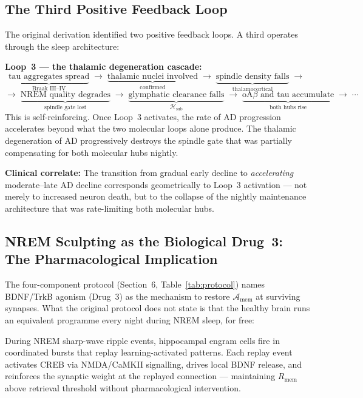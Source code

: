 \documentclass[12pt,a4paper]{article}
\newenvironment{derivenv}{%
  \begin{tcolorbox}[colback=lightgray,colframe=midgray,boxrule=0.5pt,
    arc=3pt,left=8pt,right=8pt,top=6pt,bottom=6pt,breakable]}{%
  \end{tcolorbox}}
\newcommand{\RMEM}{R_{\mathrm{mem}}}
\newcommand{\IA}{\mathcal{A}}
\begin{document}
\subsection{The Third Positive Feedback Loop}

The original derivation identified two positive
feedback loops. A third operates through the sleep
architecture:

\begin{derivenv}
\textbf{Loop~3 --- the thalamic degeneration cascade:}
\[
\underbrace{\text{tau aggregates spread}}_{\text{Braak III--IV}}
\;\longrightarrow\;
\underbrace{\text{thalamic nuclei involved}}_{\text{confirmed}}
\;\longrightarrow\;
\underbrace{\text{spindle density falls}}_{\text{thalamocortical}}
\;\longrightarrow\;
\]
\[
\longrightarrow\;
\underbrace{\text{NREM quality degrades}}_{\text{spindle gate lost}}
\;\longrightarrow\;
\underbrace{\text{glymphatic clearance falls}}_{\mathcal{H}_{\mathrm{sub}}}
\;\longrightarrow\;
\underbrace{\text{oA}\beta\text{ and tau accumulate}}_{\text{both hubs rise}}
\;\longrightarrow\;\cdots
\]
This is self-reinforcing. Once Loop~3 activates, the
rate of AD progression accelerates beyond what the
two molecular loops alone produce. The thalamic
degeneration of AD progressively destroys the spindle
gate that was partially compensating for both
molecular hubs nightly.
\end{derivenv}

\textbf{Clinical correlate:} The transition from
gradual early decline to \emph{accelerating}
moderate--late AD decline corresponds geometrically
to Loop~3 activation --- not merely to increased
neuron death, but to the collapse of the nightly
maintenance architecture that was rate-limiting
both molecular hubs.

\subsection{NREM Sculpting as the Biological
Drug~3: The Pharmacological Implication}

The four-component protocol (Section~6,
Table~\ref{tab:protocol}) names BDNF/TrkB agonism
(Drug~3) as the mechanism to restore
$\IA_{\mathrm{mem}}$ at surviving synapses. What the
original protocol does not state is that the healthy
brain runs an equivalent programme every night during
NREM sleep, for free:

During NREM sharp-wave ripple events, hippocampal
engram cells fire in coordinated bursts that replay
learning-activated patterns. Each replay event
activates CREB via NMDA/CaMKII signalling, drives
local BDNF release, and reinforces the synaptic
weight at the replayed connection --- maintaining
$\RMEM$ above retrieval threshold without pharmacological
intervention.
\end{document}
